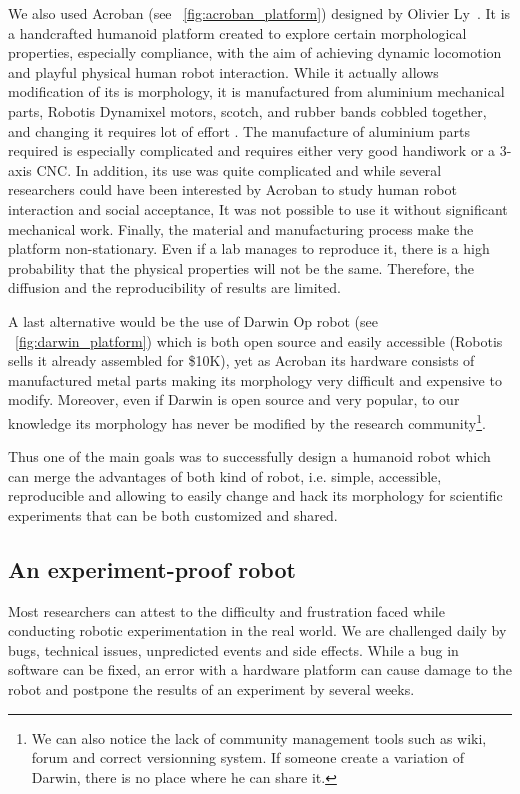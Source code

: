 We also used Acroban (see \figurename~\ref{fig:acroban_platform}) designed by Olivier Ly~\parencite{ly2011bio}. It is a handcrafted humanoid platform created to explore certain morphological properties, especially compliance, with the aim of achieving dynamic locomotion and playful physical human robot interaction.
While it actually allows modification of its is morphology, it is manufactured from aluminium mechanical parts, Robotis Dynamixel motors, scotch, and rubber bands cobbled together, and changing it requires lot of effort . The manufacture of aluminium parts required is especially complicated and requires either very good handiwork or a 3-axis CNC.
In addition, its use was quite complicated and while several researchers could have been interested by Acroban to study human robot interaction and social acceptance, It was not possible to use it without significant mechanical work.
Finally, the material and manufacturing process make the platform non-stationary. Even if a lab manages to reproduce it, there is a high probability that the physical properties will not be the same. Therefore, the diffusion and the reproducibility of results are limited.


A last alternative would be the use of Darwin Op robot (see \figurename~\ref{fig:darwin_platform}) which is both open source and easily accessible (Robotis sells it already assembled for \$10K), yet as Acroban its hardware consists of manufactured metal parts making its morphology very difficult and expensive to modify. Moreover, even if Darwin is open source and very popular, to our knowledge its morphology has never be modified by the research community\footnote{We can also notice the lack of community management tools such as wiki, forum and correct versionning system. If someone create a variation of Darwin, there is no place where he can share it.}.

Thus one of the main goals was to successfully design a humanoid robot which can merge the advantages of both kind of robot, i.e. simple, accessible, reproducible and allowing to easily change and hack its morphology for scientific experiments that can be both customized and shared.

\subsection{An experiment-proof robot} %
\label{sec:experiment-proof}

Most researchers can attest to the difficulty and frustration faced while conducting robotic experimentation in the real world. We are challenged daily by bugs, technical issues, unpredicted events and side effects. While a bug in software can be fixed, an error with a hardware platform can cause damage to the robot and postpone the results of an experiment by several weeks.

